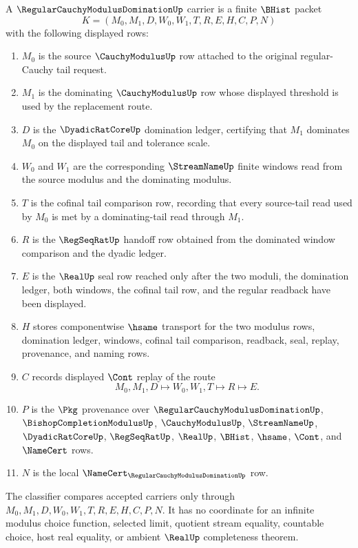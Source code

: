 \begin{definition}
\label{def:regular-cauchy-modulus-domination-carrier}
A $\RegularCauchyModulusDominationUp$ carrier is a finite $\BHist$ packet
$$
K=(M_0,M_1,D,W_0,W_1,T,R,E,H,C,P,N)
$$
with the following displayed rows:
\begin{enumerate}
\item $M_0$ is the source $\CauchyModulusUp$ row attached to the original regular-Cauchy tail request.
\item $M_1$ is the dominating $\CauchyModulusUp$ row whose displayed threshold is used by the replacement route.
\item $D$ is the $\DyadicRatCoreUp$ domination ledger, certifying that $M_1$ dominates $M_0$ on the displayed tail and tolerance scale.
\item $W_0$ and $W_1$ are the corresponding $\StreamNameUp$ finite windows read from the source modulus and the dominating modulus.
\item $T$ is the cofinal tail comparison row, recording that every source-tail read used by $M_0$ is met by a dominating-tail read through $M_1$.
\item $R$ is the $\RegSeqRatUp$ handoff row obtained from the dominated window comparison and the dyadic ledger.
\item $E$ is the $\RealUp$ seal row reached only after the two moduli, the domination ledger, both windows, the cofinal tail row, and the regular readback have been displayed.
\item $H$ stores componentwise $\hsame$ transport for the two modulus rows, domination ledger, windows, cofinal tail comparison, readback, seal, replay, provenance, and naming rows.
\item $C$ records displayed $\Cont$ replay of the route
$$
M_0,M_1,D \longmapsto W_0,W_1,T \longmapsto R \longmapsto E .
$$
\item $P$ is the $\Pkg$ provenance over $\RegularCauchyModulusDominationUp$, $\BishopCompletionModulusUp$, $\CauchyModulusUp$, $\StreamNameUp$, $\DyadicRatCoreUp$, $\RegSeqRatUp$, $\RealUp$, $\BHist$, $\hsame$, $\Cont$, and $\NameCert$ rows.
\item $N$ is the local $\NameCert_{\RegularCauchyModulusDominationUp}$ row.
\end{enumerate}
The classifier compares accepted carriers only through $M_0,M_1,D,W_0,W_1,T,R,E,H,C,P,N$. It has no coordinate for an infinite modulus choice function, selected limit, quotient stream equality, countable choice, host real equality, or ambient $\RealUp$ completeness theorem.
\end{definition}

